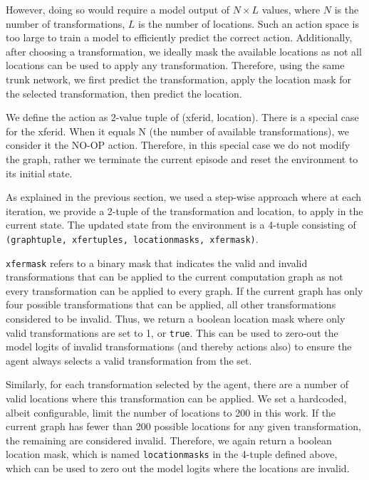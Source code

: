 However, doing so would require a model output of $N \times L$ values, where $N$ is the number of transformations, $L$ is the number of locations. Such an action space is too large to train a model to efficiently predict the correct action. Additionally, after choosing a transformation, we ideally mask the available locations as not all locations can be used to apply any transformation. Therefore, using the same trunk network, we first predict the transformation, apply the location mask for the selected transformation, then predict the location.

We define the action as 2-value tuple of (xfer\textunderscore id, location). There is a special case for the xfer\textunderscore id. When it equals N (the number of available transformations), we consider it the NO-OP action. Therefore, in this special case we do not modify the graph, rather we terminate the current episode and reset the environment to its initial state.

As explained in the previous section, we used a step-wise approach where at each iteration, we provide a 2-tuple of the transformation and location, to apply in the current state. The updated state from the environment is a 4-tuple consisting of \texttt{(graph\textunderscore tuple, xfer\textunderscore tuples, location\textunderscore masks, xfer\textunderscore mask)}.

\texttt{xfer\textunderscore mask} refers to a binary mask that indicates the valid and invalid transformations that can be applied to the current computation graph as not every transformation can be applied to every graph. If the current graph has only four possible transformations that can be applied, all other transformations considered to be invalid. Thus, we return a boolean location mask where only valid transformations are set to 1, or \texttt{true}. This can be used to zero-out the model logits of invalid transformations (and thereby actions also) to ensure the agent always selects a valid transformation from the set.

Similarly, for each transformation selected by the agent, there are a number of valid locations where this transformation can be applied. We set a hardcoded, albeit configurable, limit the number of locations to 200 in this work. If the current graph has fewer than 200 possible locations for any given transformation, the remaining are considered invalid. Therefore, we again return a boolean location mask, which is named \texttt{location\textunderscore masks} in the 4-tuple defined above, which can be used to zero out the model logits where the locations are invalid. 

